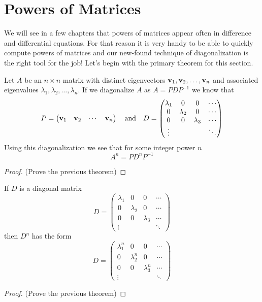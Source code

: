 \newpage\section{Powers of Matrices}
We will see in a few chapters that powers of matrices appear often in difference and
differential equations.  For that reason it is very handy to be able to quickly compute
powers of matrices and our new-found technique of diagonalization is the right tool for
the job! Let's begin with the primary theorem for this section.
\begin{thm}
    Let $A$ be an $n\times n$ matrix with distinct eigenvectors ${\bf v}_1, {\bf v}_2, \dots,
    {\bf v}_n$ and associated eigenvalues $\lambda_1, \lambda_2, \dots, \lambda_n$.  If we
    diagonalize $A$ as $A = PDP^{-1}$ we know that 
    \[ P = \begin{pmatrix} {\bf v}_1 & {\bf v}_2 & \cdots & {\bf v}_n \end{pmatrix} \quad \text{and}
        \quad D = \begin{pmatrix} \lambda_1 & 0 & 0 & \cdots \\
            0 & \lambda_2 & 0 & \cdots \\
        0 & 0 & \lambda_3 &  \cdots \\
    \vdots & && \ddots \end{pmatrix} \]
    Using this diagonalization we see that for some integer power $n$
    \[ A^n = P D^n P^{-1} \]
\end{thm}
\begin{proof}
    (Prove the previous theorem)
\end{proof}
\solution{
    \[ A^n = (PDP^{-1})^n = (PDP^{-1})(PDP^{-1})\cdots(PDP^{-1}) =
    PD(PP^{-1})D(PP^{-1})\cdots DP^{-1} = PD^nP^{-1}\]
}

\begin{thm}
    If $D$ is a diagonal matrix
    \[ D = \begin{pmatrix} \lambda_1 & 0 & 0 & \cdots \\
            0 & \lambda_2 & 0 & \cdots \\
        0 & 0 & \lambda_3 &  \cdots \\
    \vdots & && \ddots \end{pmatrix} \]
    then $D^n$ has the form
    \[ D = \begin{pmatrix} \lambda_1^n & 0 & 0 & \cdots \\
            0 & \lambda_2^n & 0 & \cdots \\
        0 & 0 & \lambda_3^n &  \cdots \\
    \vdots & && \ddots \end{pmatrix} \]
\end{thm}
\begin{proof}
    (Prove the previous theorem)
\end{proof}


